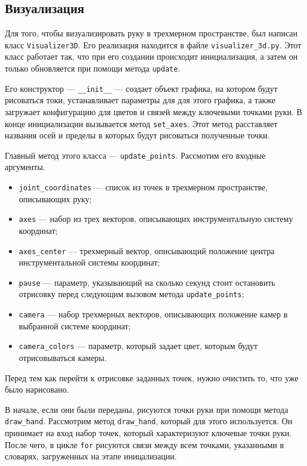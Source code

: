 \documentclass[12pt, a4paper]{article}
\begin{document}
\subsection{Визуализация}
Для того, чтобы визуализировать руку в трехмерном пространстве, был написан
класс \texttt{Visualizer3D}. Его реализация находится в файле
\texttt{visualizer\_3d.py}.
Этот класс работает так, что при его создании происходит инициализация, а
затем он только обновляется при помощи метода \texttt{update}.

Его конструктор  --- \texttt{\_\_init\_\_} ---  создает объект графика, на
котором будут рисоваться токи, устанавливает параметры для для этого графика, а
также загружает конфигурацию для цветов и связей между ключевыми точками руки.
 В конце инициализации вызывается метод \texttt{set\_axes}. Этот метод
  расставляет названия осей и пределы в которых будут рисоваться полученные точки.

Главный метод этого класса --- \texttt{update\_points}. Рассмотим его входные аргументы.
\begin{itemize}
  \item \texttt{joint\_coordinates} --- список из точек в трехмерном
    пространстве, описывающих руку;
  \item \texttt{axes} --- набор из трех векторов, описывающих инструментальную
    систему координат;
  \item \texttt{axes\_center} --- трехмерный вектор, описывающий положение
    центра инструментальной системы координат;
  \item \texttt{pause} --- параметр, указывающий на сколько секунд стоит
    остановить отрисовку перед следующим вызовом метода
    \texttt{update\_points};
  \item \texttt{camera} --- набор трехмерных векторов, описывающих положение
    камер в выбранной системе координат;
  \item \texttt{camera\_colors} --- параметр, который задает цвет, которым
    будут отрисовываться камеры.
\end{itemize}

Перед тем как перейти к отрисовке заданных точек, нужно очистить то, что уже
было нарисовано.

В начале, если они были переданы, рисуются точки руки при помощи метода
\texttt{draw\_hand}.
Рассмотрим метод \texttt{draw\_hand}, который для этого используется.
Он принимает на вход набор точек, который характеризуют ключевые точки руки.
После чего, в цикле \texttt{for} рисуются связи между всем точками, указанными
в словарях, загруженных на этапе иницализации.
\end{document}
